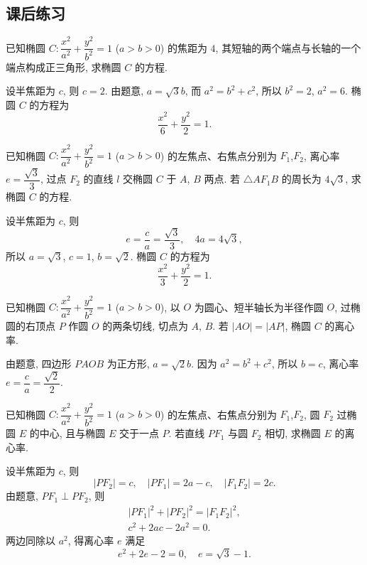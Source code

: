 \subsection{课后练习}

\begin{exercise}
    已知椭圆 $C\colon \dfrac{x^2}{a^2}+\dfrac{y^2}{b^2}=1$ ($a>b>0$) 的焦距为 $4$, 其短轴的两个端点与长轴的一个端点构成正三角形, 求椭圆 $C$ 的方程.
\end{exercise}
\beginsolution
    设半焦距为 $c$, 则 $c=2$. 由题意, $a=\sqrt3 b$, 而 $a^2=b^2+c^2$, 所以 $b^2= 2$, $a^2= 6$. 椭圆 $C$ 的方程为
    \[\frac{x^2}{6}+ \frac{y^2}{2}= 1.\]
\endsolution

\begin{exercise}
    已知椭圆 $C\colon \dfrac{x^2}{a^2}+\dfrac{y^2}{b^2}=1$ ($a>b>0$) 的左焦点、右焦点分别为 $F_1$,$F_2$, 离心率 $e= \dfrac{\sqrt3}3$, 过点 $F_2$ 的直线 $l$ 交椭圆 $C$ 于 $A$, $B$ 两点. 若 $\triangle AF_1 B$ 的周长为 $4\sqrt3$, 求椭圆 $C$ 的方程.
\end{exercise}
\beginsolution
    设半焦距为 $c$, 则 
    \[e= \frac{c}a= \frac{\sqrt3}{3},\quad
        4a= 4\sqrt3,\]
    所以 $a=\sqrt3$, $c=1$, $b=\sqrt2$. 椭圆 $C$ 的方程为
    \[\frac{x^2}{3}+ \frac{y^2}{2}= 1.\]
\endsolution

\begin{exercise}
    已知椭圆 $C\colon \dfrac{x^2}{a^2}+\dfrac{y^2}{b^2}=1$ 
    ($a>b>0$), 以 $O$ 为圆心、短半轴长为半径作圆 $O$, 
    过椭圆的右顶点 $P$ 作圆 $O$ 的两条切线, 切点为 $A$, $B$. 
    若 $|AO|= |AP|$, 椭圆 $C$ 的离心率.
\end{exercise}
\beginsolution
    由题意, 四边形 $PAOB$ 为正方形, $a=\sqrt2b$. 因为 $a^2= b^2+c^2$, 所以 $b= c$, 离心率 $e= \dfrac{c}a= \dfrac{\sqrt2}2$.
\endsolution

\begin{exercise}
    已知椭圆 $C\colon \dfrac{x^2}{a^2}+\dfrac{y^2}{b^2}=1$ 
    ($a>b>0$) 的左焦点、右焦点分别为 $F_1$,$F_2$, 圆 $F_2$ 过椭圆 $E$ 的中心, 且与椭圆 $E$ 交于一点 $P$. 若直线 $PF_1$ 与圆 $F_2$ 相切, 求椭圆 $E$ 的离心率.
\end{exercise}
\beginsolution
    设半焦距为 $c$, 则
    \[|PF_2|= c,\quad |PF_1|= 2a-c,\quad |F_1F_2|= 2c.\]
    由题意, $PF_1\perp PF_2$, 则
    \[\begin{gathered}
        |PF_1|^2+ |PF_2|^2= |F_1F_2|^2,\\
        c^2+2ac-2a^2= 0.
    \end{gathered}\]
    两边同除以 $a^2$, 得离心率 $e$ 满足
    \[e^2+2e-2= 0,\quad e= \sqrt3-1.\]
\endsolution

